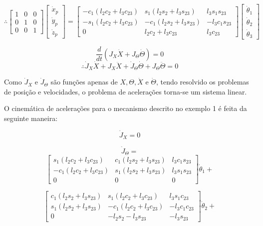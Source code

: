 \documentclass[12pt,a4paper]{article}
\begin{document}
$$ \therefore \begin{bmatrix}
1 & 0 & 0 \\
0 & 1 & 0 \\
0 & 0 & 1
\end{bmatrix}
\begin{bmatrix}
\dot{x}_p \\
\dot{y}_p \\
\dot{z}_p
\end{bmatrix}
=
\begin{bmatrix}
-c_1 (l_2 c_2 + l_3 c_{23}) & s_1 (l_2 s_2 + l_3 s_{23}) &  l_3 s_1 s_{23} \\
-s_1 (l_2 c_2 + l_3 c_{23}) & -c_1 (l_2 s_2 + l_3 s_{23}) & - l_3 c_1 s_{23} \\
0 & l_2 c_2 + l_3 c_{23} & l_3 c_{23}
\end{bmatrix}
\begin{bmatrix}
\dot{\theta}_1 \\
\dot{\theta}_2 \\
\dot{\theta}_3
\end{bmatrix}
$$
\linebreak



$$  \frac{d}{dt} ( J_X \dot{X} + J_\Theta \dot{\Theta} ) = 0 $$
$$ \therefore \dot{J}_X \dot{X} + J_X \ddot{X} + \dot{J}_\Theta \dot{\Theta} + J_\Theta \ddot{\Theta} = 0  $$

Como $\dot{J}_X$ e $\dot{J}_\Theta$ são funções apenas de $X, \Theta, \dot{X}$ e $ \dot{\Theta} $, tendo resolvido os problemas de posição e velocidades, o problema de acelerações torna-se um sistema linear. \\


O cinemática de acelerações para o mecanismo descrito no exemplo 1 é feita da seguinte maneira:

$$ \dot{J}_X = 0 $$

$$ \dot{J}_\Theta = $$
$$ \begin{bmatrix}
s_1 (l_2 c_2 + l_3 c_{23}) & c_1 (l_2 s_2 + l_3 s_{23}) &  l_3 c_1 s_{23} \\
-c_1 (l_2 c_2 + l_3 c_{23}) & s_1 (l_2 s_2 + l_3 s_{23}) &  l_3 s_1 s_{23} \\
0 & 0 & 0
\end{bmatrix} \dot{\theta}_1 + $$

$$ \begin{bmatrix}
c_1 (l_2 s_2 + l_3 s_{23}) & s_1 (l_2 c_2 + l_3 c_{23}) &  l_3 s_1 c_{23} \\
s_1 (l_2 s_2 + l_3 s_{23}) & -c_1 (l_2 c_2 + l_3 c_{23}) & - l_3 c_1 c_{23} \\
0 & -l_2 s_2 - l_3 s_{23} & -l_3 s_{23}
\end{bmatrix} \dot{\theta}_2 + $$ 
\end{document}
